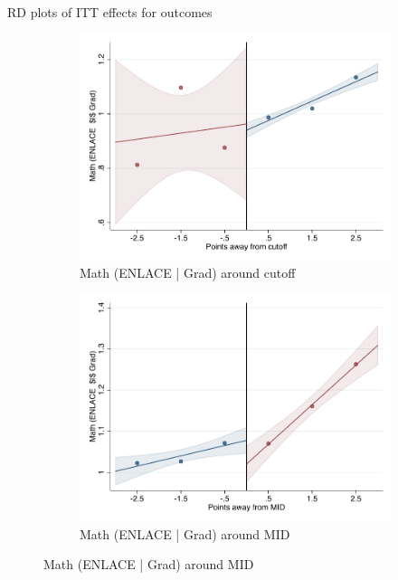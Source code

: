 \documentclass[notes,11pt, aspectratio=169]{beamer}
\begin{document}
\begin{frame}{RD plots of ITT effects for outcomes}
\hyperlink{ITT_rd_plot_IPN}{}
\begin{figure}

    \begin{subfigure}{0.45\textwidth}
        \centering
        \caption{Math (ENLACE | Grad) around cutoff}
        \includegraphics[width=\textwidth]{04_Figures/rd_plot_tau_p_mat_3_IPN3.pdf}
    \end{subfigure}
    \begin{subfigure}{0.45\textwidth}
        \centering
        \caption{Math (ENLACE | Grad) around MID}
        \includegraphics[width=\textwidth]{04_Figures/rd_plot_mid_p_mat_3_IPN3.pdf}
    \end{subfigure}
    
\end{figure}
\end{frame}
\end{document}
